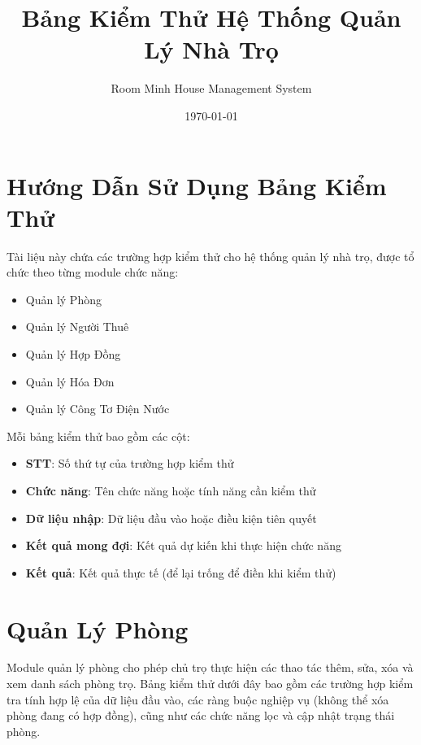 \documentclass[12pt,a4paper]{article}
\title{Bảng Kiểm Thử Hệ Thống Quản Lý Nhà Trọ}
\author{Room Minh House Management System}
\date{\today}
\begin{document}
\maketitle

\tableofcontents
\newpage

\section*{Hướng Dẫn Sử Dụng Bảng Kiểm Thử}

Tài liệu này chứa các trường hợp kiểm thử cho hệ thống quản lý nhà trọ, được tổ chức theo từng module chức năng:

\begin{itemize}
    \item Quản lý Phòng
    \item Quản lý Người Thuê
    \item Quản lý Hợp Đồng
    \item Quản lý Hóa Đơn
    \item Quản lý Công Tơ Điện Nước
\end{itemize}

Mỗi bảng kiểm thử bao gồm các cột:
\begin{itemize}
    \item \textbf{STT}: Số thứ tự của trường hợp kiểm thử
    \item \textbf{Chức năng}: Tên chức năng hoặc tính năng cần kiểm thử
    \item \textbf{Dữ liệu nhập}: Dữ liệu đầu vào hoặc điều kiện tiên quyết
    \item \textbf{Kết quả mong đợi}: Kết quả dự kiến khi thực hiện chức năng
    \item \textbf{Kết quả}: Kết quả thực tế (để lại trống để điền khi kiểm thử)
\end{itemize}

\newpage

\section{Quản Lý Phòng}

Module quản lý phòng cho phép chủ trọ thực hiện các thao tác thêm, sửa, xóa và xem danh sách phòng trọ. Bảng kiểm thử dưới đây bao gồm các trường hợp kiểm tra tính hợp lệ của dữ liệu đầu vào, các ràng buộc nghiệp vụ (không thể xóa phòng đang có hợp đồng), cũng như các chức năng lọc và cập nhật trạng thái phòng.
\end{document}
